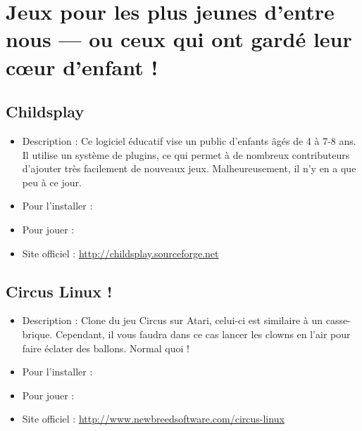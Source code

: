 \section{Jeux pour les plus jeunes d'entre nous --- ou ceux qui ont gardé leur cœur d'enfant !}
\subsection{Childsplay}
\begin{itemize}
\begingroup
{}
\item Description : Ce logiciel éducatif vise un public d'enfants âgés de 4 à 7-8 ans. Il utilise un système de plugins, ce qui permet à de nombreux contributeurs d'ajouter très facilement de nouveaux jeux. Malheureusement, il n'y en a que peu à ce jour.{\par}
\endgroup
\item Pour l'installer : 
\item Pour jouer : 
\item Site officiel : \url{http://childsplay.sourceforge.net}{\par}
\end{itemize}
\subsection{Circus Linux !}
\begin{itemize}
\begingroup
{}
\item Description : Clone du jeu Circus sur Atari, celui-ci est similaire à un casse-brique. Cependant, il vous faudra dans ce cas lancer les clowns en l'air pour faire éclater des ballons. Normal quoi !{\par}
\item Pour l'installer : 
\item Pour jouer : 
\item Site officiel : \url{http://www.newbreedsoftware.com/circus-linux}{\par}
\endgroup
\end{itemize}
